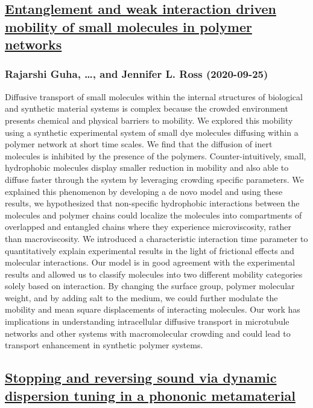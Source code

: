 \subsection*{\href{http://arxiv.org/abs/2009.12389v1}{Entanglement and weak interaction driven mobility of small molecules in  polymer networks}}
\subsubsection*{Rajarshi Guha, \dots, and Jennifer L. Ross (2020-09-25)}
Diffusive transport of small molecules within the internal structures of
biological and synthetic material systems is complex because the crowded
environment presents chemical and physical barriers to mobility. We explored
this mobility using a synthetic experimental system of small dye molecules
diffusing within a polymer network at short time scales. We find that the
diffusion of inert molecules is inhibited by the presence of the polymers.
Counter-intuitively, small, hydrophobic molecules display smaller reduction in
mobility and also able to diffuse faster through the system by leveraging
crowding specific parameters. We explained this phenomenon by developing a de
novo model and using these results, we hypothesized that non-specific
hydrophobic interactions between the molecules and polymer chains could
localize the molecules into compartments of overlapped and entangled chains
where they experience microviscosity, rather than macroviscosity. We introduced
a characteristic interaction time parameter to quantitatively explain
experimental results in the light of frictional effects and molecular
interactions. Our model is in good agreement with the experimental results and
allowed us to classify molecules into two different mobility categories solely
based on interaction. By changing the surface group, polymer molecular weight,
and by adding salt to the medium, we could further modulate the mobility and
mean square displacements of interacting molecules. Our work has implications
in understanding intracellular diffusive transport in microtubule networks and
other systems with macromolecular crowding and could lead to transport
enhancement in synthetic polymer systems.

\subsection*{\href{http://arxiv.org/abs/2009.12387v1}{Stopping and reversing sound via dynamic dispersion tuning in a phononic  metamaterial}}
